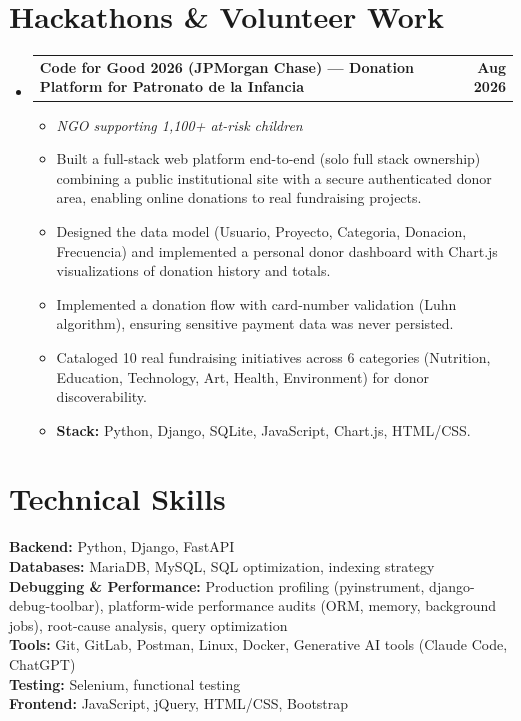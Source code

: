 \documentclass[letterpaper,10pt]{article}
\makeatletter
\newcommand{\resumeItem}[1]{
  \item\small{
    {#1 \vspace{-2pt}}
  }
}
\newcommand{\resumeProjectHeading}[2]{
    \vspace{-2pt}\item
    \begin{tabular*}{1.0\textwidth}{l@{\extracolsep{\fill}}r}
      \small#1 & \textbf{\small #2}\\
    \end{tabular*}\vspace{-6pt}
}
\newcommand{\resumeSubHeadingListStart}{\begin{itemize}[leftmargin=0.0in, label={}]}
\newcommand{\resumeSubHeadingListEnd}{\end{itemize}}
\newcommand{\resumeItemListStart}{\begin{itemize}[leftmargin=0.15in, labelsep=5pt, itemsep=2pt]}
\newcommand{\resumeItemListEnd}{\end{itemize}\vspace{-4pt}}
\makeatother
\begin{document}
\section{Hackathons \& Volunteer Work}
    \resumeSubHeadingListStart
      \resumeProjectHeading
          {\textbf{Code for Good 2026 (JPMorgan Chase) --- Donation Platform for Patronato de la Infancia}}{Aug 2026}
          \resumeItemListStart
            \resumeItem{\emph{NGO supporting 1,100+ at-risk children}}
            \resumeItem{Built a full-stack web platform end-to-end (solo full stack ownership) combining a public institutional site with a secure authenticated donor area, enabling online donations to real fundraising projects.}
            \resumeItem{Designed the data model (Usuario, Proyecto, Categoria, Donacion, Frecuencia) and implemented a personal donor dashboard with Chart.js visualizations of donation history and totals.}
            \resumeItem{Implemented a donation flow with card-number validation (Luhn algorithm), ensuring sensitive payment data was never persisted.}
            \resumeItem{Cataloged 10 real fundraising initiatives across 6 categories (Nutrition, Education, Technology, Art, Health, Environment) for donor discoverability.}
            \resumeItem{\textbf{Stack:} Python, Django, SQLite, JavaScript, Chart.js, HTML/CSS.}
          \resumeItemListEnd
    \resumeSubHeadingListEnd

\section{Technical Skills}
 \begin{itemize}[leftmargin=0.15in, label={}]
    \small{\item{
     \textbf{Backend:}{ Python, Django, FastAPI} \\
     \textbf{Databases:}{ MariaDB, MySQL, SQL optimization, indexing strategy} \\
     \textbf{Debugging \& Performance:}{ Production profiling (pyinstrument, django-debug-toolbar), platform-wide performance audits (ORM, memory, background jobs), root-cause analysis, query optimization} \\
     \textbf{Tools:}{ Git, GitLab, Postman, Linux, Docker, Generative AI tools (Claude Code, ChatGPT)} \\
     \textbf{Testing:}{ Selenium, functional testing} \\
     \textbf{Frontend:}{ JavaScript, jQuery, HTML/CSS, Bootstrap}
    }}
 \end{itemize}
\end{document}
